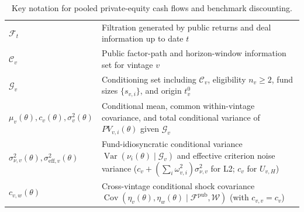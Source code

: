 \begin{table}[htbp]
\begin{tabularx}{\textwidth}{@{}lX@{}}
		$\mathcal{F}_t$ & Filtration generated by public returns and deal information up to date $t$ \\
		$\mathcal{C}_v$ & Public factor-path and horizon-window information set for vintage $v$ \\
		$\mathcal{G}_v$ & Conditioning set including $\mathcal{C}_v$, eligibility $n_v\ge 2$, fund sizes $\{s_{v,i}\}$, and origin $t_v^0$ \\
		$\mu_v(\theta), c_v(\theta), \sigma_v^2(\theta)$ & Conditional mean, common within-vintage covariance, and total conditional variance of $PV_{v,i}(\theta)$ given $\mathcal{G}_v$ \\
		$\sigma_{\nu,v}^2(\theta), \sigma_{\mathrm{eff},v}^2(\theta)$ & Fund-idiosyncratic conditional variance $\operatorname{Var}(\nu_i(\theta)\mid\mathcal{G}_v)$ and effective criterion noise variance ($c_v + (\sum_i \omega_{v,i}^2)\sigma_{\nu,v}^2$ for L2; $c_v$ for $U_{v,H}$) \\
		$c_{v,w}(\theta)$ & Cross-vintage conditional shock covariance $\operatorname{Cov}(\eta_v(\theta), \eta_w(\theta) \mid \mathcal{F}^{\mathrm{pub}}, \mathcal{W})$ (with $c_{v,v} = c_v$) \\
		\bottomrule
	\end{tabularx}
	\caption{Key notation for pooled private-equity cash flows and benchmark discounting.}
	\label{tab:notation_asset_pricing}
\end{table}

